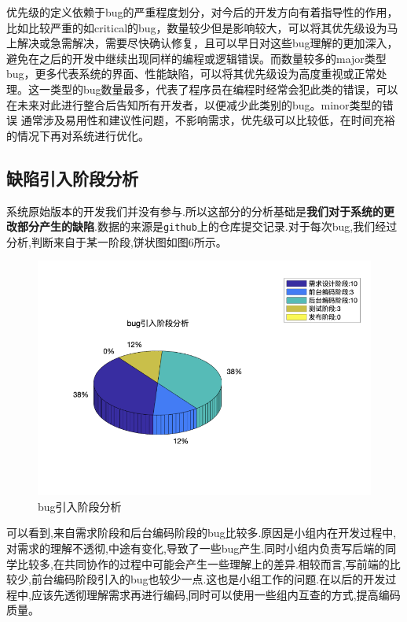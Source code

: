 \documentclass[hyperref, a4paper]{ctexart}
\begin{document}
优先级的定义依赖于bug的严重程度划分，对今后的开发方向有着指导性的作用，比如比较严重的如critical的bug，数量较少但是影响较大，可以将其优先级设为马上解决或急需解决，需要尽快确认修复，且可以早日对这些bug理解的更加深入，避免在之后的开发中继续出现同样的编程或逻辑错误。而数量较多的major类型bug，更多代表系统的界面、性能缺陷，可以将其优先级设为高度重视或正常处理。这一类型的bug数量最多，代表了程序员在编程时经常会犯此类的错误，可以在未来对此进行整合后告知所有开发者，以便减少此类别的bug。minor类型的错误
通常涉及易用性和建议性问题，不影响需求，优先级可以比较低，在时间充裕的情况下再对系统进行优化。

\hypertarget{ux7f3aux9677ux5f15ux5165ux9636ux6bb5ux5206ux6790}{%
\subsection{缺陷引入阶段分析}\label{ux7f3aux9677ux5f15ux5165ux9636ux6bb5ux5206ux6790}}

系统原始版本的开发我们并没有参与.所以这部分的分析基础是\textbf{我们对于系统的更改部分产生的缺陷}.数据的来源是\texttt{github}上的仓库提交记录.对于每次bug,我们经过分析,判断来自于某一阶段,饼状图如图6所示。

\begin{figure}
\centering
\includegraphics{pic/1.png}
\caption{bug引入阶段分析}
\end{figure}

可以看到,来自需求阶段和后台编码阶段的bug比较多.原因是小组内在开发过程中,对需求的理解不透彻,中途有变化,导致了一些bug产生.同时小组内负责写后端的同学比较多,在共同协作的过程中可能会产生一些理解上的差异.相较而言,写前端的比较少,前台编码阶段引入的bug也较少一点.这也是小组工作的问题.在以后的开发过程中,应该先透彻理解需求再进行编码,同时可以使用一些组内互查的方式,提高编码质量。
\end{document}
